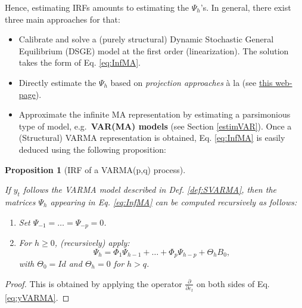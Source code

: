 \documentclass[
  11pt,
]{book}
\providecommand{\tightlist}{%
  \setlength{\itemsep}{0pt}\setlength{\parskip}{0pt}}
\newtheorem{proposition}{Proposition}[chapter]
\theoremstyle{definition}
\theoremstyle{definition}
\theoremstyle{definition}
\theoremstyle{definition}
\theoremstyle{remark}
\begin{document}
Hence, estimating IRFs amounts to estimating the \(\Psi_{h}\)'s. In general, there exist three main approaches for that:

\begin{itemize}
\tightlist
\item
  Calibrate and solve a (purely structural) Dynamic Stochastic General Equilibrium (DSGE) model at the first order (linearization). The solution takes the form of Eq. \eqref{eq:InfMA}.
\item
  Directly estimate the \(\Psi_{h}\) based on \emph{projection approaches} à la \citet{Jorda_2005} (see \href{https://jrenne.github.io/IdentifStructShocks/Projections.html}{this web-page}).
\item
  Approximate the infinite MA representation by estimating a parsimonious type of model, e.g.~\textbf{VAR(MA) models} (see Section \ref{estimVAR}). Once a (Structural) VARMA representation is obtained, Eq. \eqref{eq:InfMA} is easily deduced using the following proposition:
\end{itemize}

\begin{proposition}[IRF of a VARMA(p,q) process]
\protect\hypertarget{prp:computPsiVAR}{}\label{prp:computPsiVAR}

If \(y_t\) follows the VARMA model described in Def. \ref{def:SVARMA}, then the matrices \(\Psi_h\) appearing in Eq. \eqref{eq:InfMA} can be computed recursively as follows:

\begin{enumerate}
\def\labelenumi{\arabic{enumi}.}
\tightlist
\item
  Set \(\Psi_{-1}=\dots=\Psi_{-p}=0\).
\item
  For \(h \ge 0\), (recursively) apply:
  \[
  \Psi_h = \Phi_1 \Psi_{h-1} + \dots + \Phi_p \Psi_{h-p} + \Theta_h B_0,
  \]
  with \(\Theta_0 = Id\) and \(\Theta_h = 0\) for \(h>q\).
\end{enumerate}

\end{proposition}

\begin{proof}
This is obtained by applying the operator \(\frac{\partial}{\partial \varepsilon_{t}}\) on both sides of Eq. \eqref{eq:yVARMA}.
\end{proof}
\end{document}
